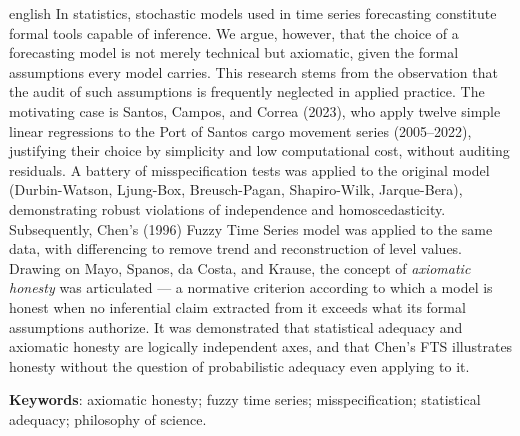 \documentclass[
    12pt,
    oneside,
    openany,
    a4paper,
    english,
    brazil
]{abntex2}
\theoremstyle{definition}
\begin{document}
\begin{resumo}[Abstract]
    \begin{otherlanguage*}{english}
In statistics, stochastic models used in time series forecasting constitute formal tools capable of inference. We argue, however, that the choice of a forecasting model is not merely technical but axiomatic, given the formal assumptions every model carries. This research stems from the observation that the audit of such assumptions is frequently neglected in applied practice. The motivating case is Santos, Campos, and Correa (2023), who apply twelve simple linear regressions to the Port of Santos cargo movement series (2005--2022), justifying their choice by simplicity and low computational cost, without auditing residuals. A battery of misspecification tests was applied to the original model (Durbin-Watson, Ljung-Box, Breusch-Pagan, Shapiro-Wilk, Jarque-Bera), demonstrating robust violations of independence and homoscedasticity. Subsequently, Chen's (1996) Fuzzy Time Series model was applied to the same data, with differencing to remove trend and reconstruction of level values. Drawing on Mayo, Spanos, da Costa, and Krause, the concept of \textit{axiomatic honesty} was articulated --- a normative criterion according to which a model is honest when no inferential claim extracted from it exceeds what its formal assumptions authorize. It was demonstrated that statistical adequacy and axiomatic honesty are logically independent axes, and that Chen's FTS illustrates honesty without the question of probabilistic adequacy even applying to it.

        \vspace{\onelineskip}
        \noindent
        \textbf{Keywords}: axiomatic honesty; fuzzy time series; misspecification; statistical adequacy; philosophy of science.
    \end{otherlanguage*}
\end{resumo}

\listoffigures*
\cleardoublepage

\listoftables*
\cleardoublepage
\end{document}
